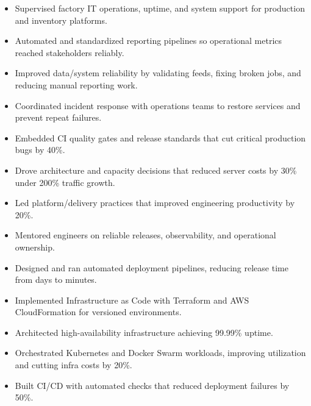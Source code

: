 
\begin{itemize}
\item Supervised factory IT operations, uptime, and system support for production and inventory platforms.
\item Automated and standardized reporting pipelines so operational metrics reached stakeholders reliably.
\item Improved data/system reliability by validating feeds, fixing broken jobs, and reducing manual reporting work.
\item Coordinated incident response with operations teams to restore services and prevent repeat failures.
\end{itemize}
\divider

\begin{itemize}
\item Embedded CI quality gates and release standards that cut critical production bugs by 40\%.
\item Drove architecture and capacity decisions that reduced server costs by 30\% under 200\% traffic growth.
\item Led platform/delivery practices that improved engineering productivity by 20\%.
\item Mentored engineers on reliable releases, observability, and operational ownership.
\end{itemize}
\divider

\begin{itemize}
\item Designed and ran automated deployment pipelines, reducing release time from days to minutes.
\item Implemented Infrastructure as Code with Terraform and AWS CloudFormation for versioned environments.
\item Architected high-availability infrastructure achieving 99.99\% uptime.
\item Orchestrated Kubernetes and Docker Swarm workloads, improving utilization and cutting infra costs by 20\%.
\item Built CI/CD with automated checks that reduced deployment failures by 50\%.
\end{itemize}
\divider

